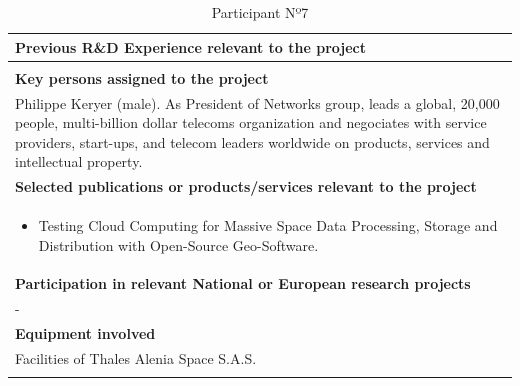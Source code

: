 \begin{longtable}[H]{|p{0.7cm}|p{4cm}|p{7cm}|p{1.3cm}|}
	\multicolumn{4}{|p{13cm}|}{\textbf{Previous R\&D Experience relevant to the project}}  \\ \hline
	
	\multicolumn{4}{|p{14.5cm}|}{}  \\ \hline
	
	\multicolumn{4}{|p{13cm}|}{\textbf{Key persons assigned to the project}}   \\ \hline
	
	\multicolumn{4}{|p{14.5cm}|}{Philippe Keryer (male). As President of Networks group, leads a global, 20,000 people, multi-billion dollar telecoms organization and negociates with service providers, start-ups, and telecom leaders worldwide on products, services and intellectual property.}  \\ \hline
	
	\multicolumn{4}{|p{13cm}|}{\textbf{Selected publications or products/services relevant to the project}}  \\ \hline
	
	\multicolumn{4}{|p{14.5cm}|}{
	\begin{itemize}
		\item Testing Cloud Computing for Massive Space Data Processing, Storage and Distribution with Open-Source Geo-Software.
	\end{itemize}}  \\ \hline
	
	\multicolumn{4}{|p{13cm}|}{\textbf{Participation in relevant National or European research projects}}  \\ \hline
	
	\multicolumn{4}{|p{14.5cm}|}{-}  \\ \hline
	
	\multicolumn{4}{|p{13cm}|}{\textbf{Equipment involved}}  \\ \hline
	
	\multicolumn{4}{|p{14.5cm}|}{Facilities of Thales Alenia Space S.A.S.}  \\ \hline
	\caption{Participant Nº7}
\end{longtable}

